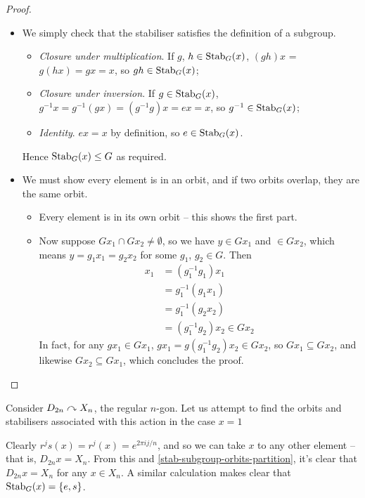 \documentclass{../template/note}
\begin{document}
    \begin{proof}
        \begin{itemize}
            \item We simply check that the stabiliser satisfies the definition of a subgroup.
            \begin{itemize}
                \item \emph{Closure under multiplication}. If \(g\), \(h \in \operatorname{Stab}_G(x)\), \((gh)x\) = \(g(hx) = gx = x\), so \(gh \in \operatorname{Stab}_G(x)\);
                \item \emph{Closure under inversion}. If \(g \in \operatorname{Stab}_G(x)\), \(g^{-1}x = g^{-1}(gx) = (g^{-1}g)x = ex = x\), so \(g^{-1} \in \operatorname{Stab}_G(x)\);
                \item \emph{Identity}. \(ex = x\) by definition, so \(e \in \operatorname{Stab}_G(x)\).
            \end{itemize}
            Hence \(\operatorname{Stab}_G(x) \leq G\) as required.
            \item We must show every element is in an orbit, and if two orbits overlap, they are the same orbit.
            \begin{itemize}
                \item Every element is in its own orbit -- this shows the first part.
                \item Now suppose \(Gx_1 \cap Gx_2 \neq \emptyset\), so we have \(y \in Gx_1\) and \(\in Gx_2\), which means \(y = g_1x_1 = g_2x_2\) for some \(g_1\), \(g_2 \in G\). Then
                \begin{align*}
                    x_1 &= (g_1^{-1}g_1)x_1 \\
                    &= g_1^{-1} (g_1x_1) \\
                    &= g_1^{-1} (g_2x_2) \\
                    &= (g_1^{-1}g_2) x_2 \in Gx_2
                \end{align*}
                In fact, for any \(gx_1 \in Gx_1\), \(gx_1 = g(g_1^{-1}g_2)x_2 \in Gx_2\), so \(Gx_1 \subseteq Gx_2\), and likewise \(Gx_2 \subseteq Gx_1\), which concludes the proof.
            \end{itemize}
        \end{itemize}
    \end{proof}
    
    \begin{example*}
        Consider \(D_{2n} \curvearrowright X_n\), the regular \(n\)-gon. Let us attempt to find the orbits and stabilisers associated with this action in the case \(x=1\)

        Clearly \(r^js(x) = r^j(x) = e^{2 \pi i j/n}\), and so we can take \(x\) to any other element -- that is, \(D_{2n}x = X_n\). From this and \cref{stab-subgroup-orbits-partition}, it's clear that \(D_{2n}x = X_n\) for any \(x \in X_n\).  A similar calculation makes clear that \(\operatorname{Stab}_G(x) = \{e, s\}\).
    \end{example*}
    
\end{document}
